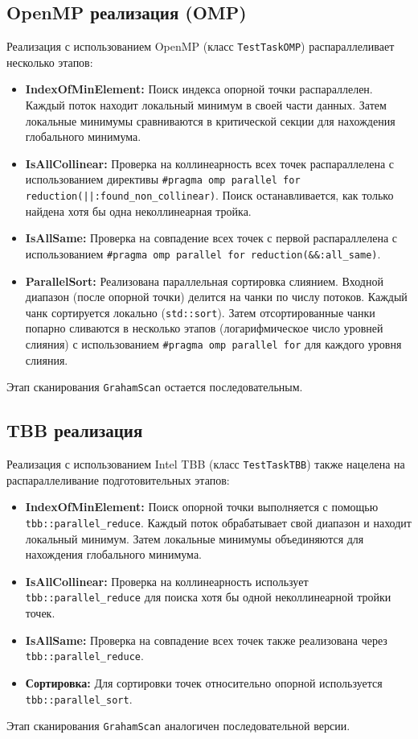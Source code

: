 \documentclass[12pt]{article}
\begin{document}
\subsection{OpenMP реализация (OMP)}
Реализация с использованием OpenMP (класс \texttt{TestTaskOMP}) распараллеливает несколько этапов:
\begin{itemize}
    \item \textbf{IndexOfMinElement:} Поиск индекса опорной точки распараллелен. Каждый поток находит локальный минимум в своей части данных. Затем локальные минимумы сравниваются в критической секции для нахождения глобального минимума.
    \item \textbf{IsAllCollinear:} Проверка на коллинеарность всех точек распараллелена с использованием директивы \texttt{\#pragma omp parallel for reduction(||:found\_non\_collinear)}. Поиск останавливается, как только найдена хотя бы одна неколлинеарная тройка.
    \item \textbf{IsAllSame:} Проверка на совпадение всех точек с первой распараллелена с использованием \texttt{\#pragma omp parallel for reduction(\&\&:all\_same)}.
    \item \textbf{ParallelSort:} Реализована параллельная сортировка слиянием. Входной диапазон (после опорной точки) делится на чанки по числу потоков. Каждый чанк сортируется локально (\texttt{std::sort}). Затем отсортированные чанки попарно сливаются в несколько этапов (логарифмическое число уровней слияния) с использованием \texttt{\#pragma omp parallel for} для каждого уровня слияния.
\end{itemize}
Этап сканирования \texttt{GrahamScan} остается последовательным.

\subsection{TBB реализация}
Реализация с использованием Intel TBB (класс \texttt{TestTaskTBB}) также нацелена на распараллеливание подготовительных этапов:
\begin{itemize}
    \item \textbf{IndexOfMinElement:} Поиск опорной точки выполняется с помощью \texttt{tbb::parallel\_reduce}. Каждый поток обрабатывает свой диапазон и находит локальный минимум. Затем локальные минимумы объединяются для нахождения глобального минимума.
    \item \textbf{IsAllCollinear:} Проверка на коллинеарность использует \texttt{tbb::parallel\_reduce} для поиска хотя бы одной неколлинеарной тройки точек.
    \item \textbf{IsAllSame:} Проверка на совпадение всех точек также реализована через \texttt{tbb::parallel\_reduce}.
    \item \textbf{Сортировка:} Для сортировки точек относительно опорной используется \texttt{tbb::parallel\_sort}.
\end{itemize}
Этап сканирования \texttt{GrahamScan} аналогичен последовательной версии.
\end{document}
